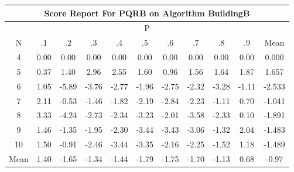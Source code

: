 \documentclass[11pt,a4paper]{report}
\begin{document}
\begin{longtable}{ | c || c | c | c | c | c | c | c | c | c || c |}
\hline
\multicolumn{11}{|c|}{ Score Report For PQRB on Algorithm BuildingB} \\
\hline
\multicolumn{11}{|c|}{ P } \\
\hline
N & .1 & .2 & .3 & .4 & .5 & .6 & .7 & .8 & .9 & Mean\\
 \hline
 \hline
 \endhead
  4 &  \cellcolor[HTML]{FFFFFF} 0.00 &  \cellcolor[HTML]{FFFFFF} 0.00 &  \cellcolor[HTML]{FFFFFF} 0.00 &  \cellcolor[HTML]{FFFFFF} 0.00 &  \cellcolor[HTML]{FFFFFF} 0.00 &  \cellcolor[HTML]{FFFFFF} 0.00 &  \cellcolor[HTML]{FFFFFF} 0.00 &  \cellcolor[HTML]{FFFFFF} 0.00 &  \cellcolor[HTML]{FFFFFF} 0.00 & 0.000 \\
  5 &  \cellcolor[HTML]{F7F7FF} 0.37 &  \cellcolor[HTML]{DFDFFF} 1.40 &  \cellcolor[HTML]{B7B7FF} 2.96 &  \cellcolor[HTML]{BFBFFF} 2.55 &  \cellcolor[HTML]{D7D7FF} 1.60 &  \cellcolor[HTML]{E7E7FF} 0.96 &  \cellcolor[HTML]{D7D7FF} 1.56 &  \cellcolor[HTML]{D7D7FF} 1.64 &  \cellcolor[HTML]{CFCFFF} 1.87 & 1.657 \\
  6 &  \cellcolor[HTML]{E7E7FF} 1.05 &  \cellcolor[HTML]{FF6868} -5.89 &  \cellcolor[HTML]{FF9F9F} -3.76 &  \cellcolor[HTML]{FFB7B7} -2.77 &  \cellcolor[HTML]{FFCFCF} -1.96 &  \cellcolor[HTML]{FFB7B7} -2.75 &  \cellcolor[HTML]{FFC7C7} -2.32 &  \cellcolor[HTML]{FFAFAF} -3.28 &  \cellcolor[HTML]{FFE7E7} -1.11 & -2.533 \\
  7 &  \cellcolor[HTML]{C7C7FF} 2.11 &  \cellcolor[HTML]{FFEFEF} -0.53 &  \cellcolor[HTML]{FFD7D7} -1.46 &  \cellcolor[HTML]{FFCFCF} -1.82 &  \cellcolor[HTML]{FFC7C7} -2.19 &  \cellcolor[HTML]{FFB7B7} -2.84 &  \cellcolor[HTML]{FFC7C7} -2.23 &  \cellcolor[HTML]{FFDFDF} -1.11 &  \cellcolor[HTML]{EFEFFF} 0.70 & -1.041 \\
  8 &  \cellcolor[HTML]{AFAFFF} 3.33 &  \cellcolor[HTML]{FF9797} -4.24 &  \cellcolor[HTML]{FFB7B7} -2.73 &  \cellcolor[HTML]{FFC7C7} -2.34 &  \cellcolor[HTML]{FFAFAF} -3.23 &  \cellcolor[HTML]{FFCFCF} -2.01 &  \cellcolor[HTML]{FFA7A7} -3.58 &  \cellcolor[HTML]{FFC7C7} -2.33 &  \cellcolor[HTML]{FFFFFF} 0.10 & -1.891 \\
  9 &  \cellcolor[HTML]{D7D7FF} 1.46 &  \cellcolor[HTML]{FFDFDF} -1.35 &  \cellcolor[HTML]{FFCFCF} -1.95 &  \cellcolor[HTML]{FFC7C7} -2.30 &  \cellcolor[HTML]{FFA7A7} -3.44 &  \cellcolor[HTML]{FFA7A7} -3.43 &  \cellcolor[HTML]{FFAFAF} -3.06 &  \cellcolor[HTML]{FFDFDF} -1.32 &  \cellcolor[HTML]{CFCFFF} 2.04 & -1.483 \\
  10 &  \cellcolor[HTML]{D7D7FF} 1.50 &  \cellcolor[HTML]{FFE7E7} -0.91 &  \cellcolor[HTML]{FFBFBF} -2.46 &  \cellcolor[HTML]{FFA7A7} -3.44 &  \cellcolor[HTML]{FFA7A7} -3.35 &  \cellcolor[HTML]{FFC7C7} -2.16 &  \cellcolor[HTML]{FFC7C7} -2.25 &  \cellcolor[HTML]{FFD7D7} -1.52 &  \cellcolor[HTML]{DFDFFF} 1.18 & -1.489 \\
 \hline
 \hline
Mean &  \cellcolor[HTML]{DFDFFF} 1.40 &  \cellcolor[HTML]{FFD7D7} -1.65 &  \cellcolor[HTML]{FFDFDF} -1.34 &  \cellcolor[HTML]{FFD7D7} -1.44 &  \cellcolor[HTML]{FFCFCF} -1.79 &  \cellcolor[HTML]{FFCFCF} -1.75 &  \cellcolor[HTML]{FFD7D7} -1.70 &  \cellcolor[HTML]{FFDFDF} -1.13 &  \cellcolor[HTML]{EFEFFF} 0.68 &  \cellcolor[HTML]{FFE7E7} -0.97
\end{longtable}
\end{document}
